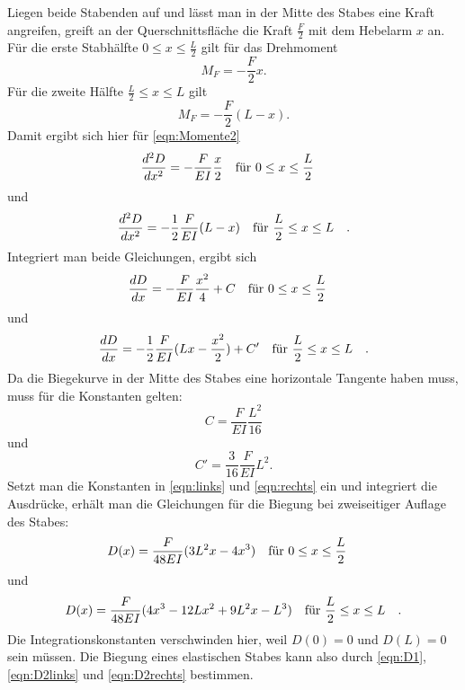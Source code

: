 \noindent Liegen beide Stabenden auf und lässt man in der Mitte des Stabes
eine Kraft angreifen, greift an der Querschnittsfläche die Kraft
$\frac{F}{2}$ mit dem Hebelarm $x$ an. Für die erste Stabhälfte $0 \leq x \leq \frac{L}{2}$
gilt für das Drehmoment
\begin{equation*}
M_{F} = - \frac{F}{2} x.
\end{equation*}
Für die zweite Hälfte $\frac{L}{2} \leq x \leq L$ gilt
\begin{equation*}
M_{F} = - \frac{F}{2} (L-x).
\end{equation*}
Damit ergibt sich hier für \eqref{eqn:Momente2}
\begin{equation}
\frac{d^2D}{dx^2} = - \frac{F}{EI} \frac{x}{2} \qq{für $0 \leq x \leq \frac{L}{2}$}
\label{eqn:links}
\end{equation}
und
\begin{equation}
\frac{d^2D}{dx^2} = -\frac{1}{2} \frac{F}{EI} (L-x) \qq{für $\frac{L}{2} \leq x \leq L$}.
\label{eqn:rechts}
\end{equation}
Integriert man beide Gleichungen, ergibt sich 
\begin{equation*}
\frac{dD}{dx} = - \frac{F}{EI} \frac{x^2}{4} + C \qq{für $0 \leq x \leq \frac{L}{2}$}
\end{equation*}
und
\begin{equation*}
\frac{dD}{dx} = - \frac{1}{2} \frac{F}{EI} (Lx-\frac{x^2}{2}) + C' \qq{für $\frac{L}{2} \leq x \leq L$}.
\end{equation*}
Da die Biegekurve in der Mitte des Stabes eine horizontale Tangente
haben muss, muss für die Konstanten gelten:
\begin{equation*}
C = \frac{F}{EI} \frac{L^2}{16}
\end{equation*}
und
\begin{equation*}
C' = \frac{3}{16} \frac{F}{EI} L^2.
\end{equation*}
Setzt man die Konstanten in \eqref{eqn:links} und \eqref{eqn:rechts}
ein und integriert die Ausdrücke, erhält man die Gleichungen
für die Biegung bei zweiseitiger Auflage des Stabes:
\begin{equation}
D(x) = \frac{F}{48EI} (3L^2x - 4x^3) \qq{für $0 \leq x \leq \frac{L}{2}$}
\label{eqn:D2links}
\end{equation}
und
\begin{equation}
D(x) = \frac{F}{48EI} (4x^3 - 12Lx^2 + 9L^2x - L^3) \qq{für $\frac{L}{2} \leq x \leq L$}.
\label{eqn:D2rechts}
\end{equation}
Die Integrationskonstanten verschwinden hier, weil $D(0) = 0$ und $D(L) = 0$ sein müssen.
Die Biegung eines elastischen Stabes kann also durch
\eqref{eqn:D1}, \eqref{eqn:D2links} und \eqref{eqn:D2rechts} bestimmen.

